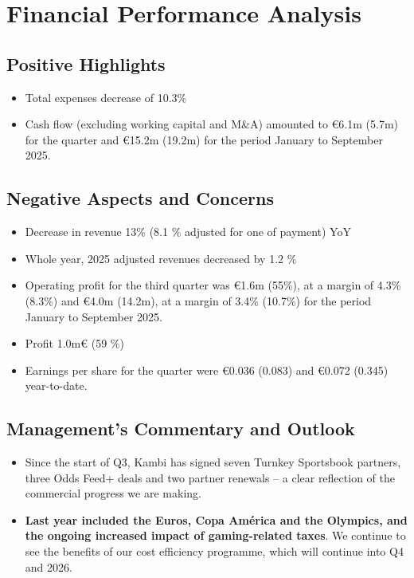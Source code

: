 \documentclass[a4paper, 11pt, oneside]{article} %
\begin{document}
\section{Financial Performance Analysis}

\subsection{Positive Highlights}
\begin{itemize}
	\item Total expenses decrease of 10.3\%
	\item	Cash flow (excluding working capital and M\&A) amounted to €6.1m (5.7m) for the quarter and
	      €15.2m (19.2m) for the period January to September 2025.
\end{itemize}

\subsection{Negative Aspects and Concerns}
\begin{itemize}
	\item Decrease in revenue 13\% (8.1 \% adjusted for one of payment) YoY
	\item Whole year, 2025 adjusted revenues decreased by 1.2 \%
	\item	Operating profit for the third quarter was €1.6m (55\%), at a margin of 4.3\% (8.3\%) and €4.0m
	      (14.2m), at a margin of 3.4\% (10.7\%) for the period January to September 2025.
	\item Profit 1.0m€ (59 \%)
	\item Earnings per share for the quarter were €0.036 (0.083) and €0.072 (0.345) year-to-date.
\end{itemize}

\subsection{Management's Commentary and Outlook}
\begin{itemize}
	\item  Since the start of Q3, Kambi has signed seven Turnkey Sportsbook partners,
	      three Odds Feed+ deals and two partner renewals – a clear reflection of the
	      commercial progress we are making.
	\item	\textbf{Last year included the Euros, Copa América and the Olympics, and the ongoing increased impact of
		      gaming-related taxes}. We continue to see the
	      benefits of our cost efficiency programme, which will continue into Q4 and 2026.
\end{itemize}
\end{document}
